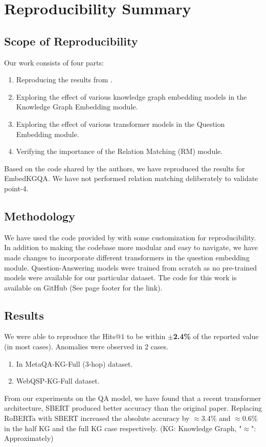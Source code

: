 \section{Reproducibility Summary}

\subsection{Scope of Reproducibility}
Our work consists of four parts: 
\begin{enumerate}
\item Reproducing the results from \cite{saxena-etal-2020-improving}.
\item Exploring the effect of various knowledge graph embedding models in the Knowledge Graph Embedding module.
\item Exploring the effect of various transformer models in the Question Embedding module.
\item Verifying the importance of the Relation Matching (RM) module.
\end{enumerate}

Based on the code shared by the authors, we have reproduced the results for EmbedKGQA\cite{saxena-etal-2020-improving}. We have not performed relation matching deliberately to validate point-4.

\subsection{Methodology}

We have used the code provided by \cite{saxena-etal-2020-improving} with some customization for reproducibility. In addition to making the codebase more modular and easy to navigate, we have made changes to incorporate different transformers in the question embedding module. Question-Answering models were trained from scratch as no pre-trained models were available for our particular dataset. The code for this work is available on GitHub (See page footer for the link).

\subsection{Results}
We were able to reproduce the Hits@$1$ to be within \textbf{$\pm$2.4\%} of the reported value (in most cases). Anomalies were observed in 2 cases. 
\begin{enumerate}
\item In MetaQA-KG-Full (3-hop) dataset.
\item WebQSP-KG-Full dataset.
\end{enumerate}
From our experiments on the QA model, we have found that a recent transformer architecture, SBERT\cite{reimers-2019-sentence-bert} produced better accuracy than the original paper. Replacing RoBERTa\cite{roberta} with SBERT\cite{reimers-2019-sentence-bert} increased the absolute accuracy by $\approx$3.4\% and $\approx$0.6\% in the half KG and the full KG case respectively. (KG: Knowledge Graph, "$\approx$": Approximately)

